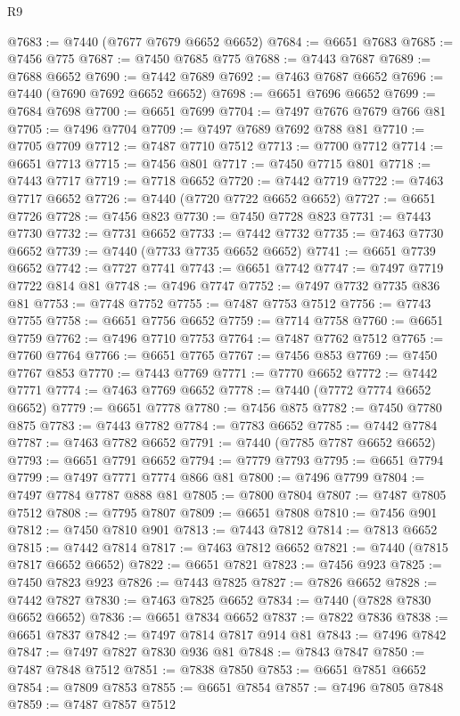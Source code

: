 \begin{lexlean}{R9}
\begin{coremodule}
{{{{{{{{{{{{{{{{{{{{{{{{{{{{{{{{{{{{{{{{{{{{{{{{{{{{{{{{{{{{{{{{{{{{{{{{{{{{{{{{{{{{@7683 := @7440 (@7677 @7679 @6652 @6652)
@7684 := @6651 @7683
@7685 := @7456 @775
@7687 := @7450 @7685 @775
@7688 := @7443 @7687
@7689 := @7688 @6652
@7690 := @7442 @7689
@7692 := @7463 @7687 @6652
@7696 := @7440 (@7690 @7692 @6652 @6652)
@7698 := @6651 @7696 @6652
@7699 := @7684 @7698
@7700 := @6651 @7699
@7704 := @7497 @7676 @7679 @766 @81
@7705 := @7496 @7704
@7709 := @7497 @7689 @7692 @788 @81
@7710 := @7705 @7709
@7712 := @7487 @7710 @7512
@7713 := @7700 @7712
@7714 := @6651 @7713
@7715 := @7456 @801
@7717 := @7450 @7715 @801
@7718 := @7443 @7717
@7719 := @7718 @6652
@7720 := @7442 @7719
@7722 := @7463 @7717 @6652
@7726 := @7440 (@7720 @7722 @6652 @6652)
@7727 := @6651 @7726
@7728 := @7456 @823
@7730 := @7450 @7728 @823
@7731 := @7443 @7730
@7732 := @7731 @6652
@7733 := @7442 @7732
@7735 := @7463 @7730 @6652
@7739 := @7440 (@7733 @7735 @6652 @6652)
@7741 := @6651 @7739 @6652
@7742 := @7727 @7741
@7743 := @6651 @7742
@7747 := @7497 @7719 @7722 @814 @81
@7748 := @7496 @7747
@7752 := @7497 @7732 @7735 @836 @81
@7753 := @7748 @7752
@7755 := @7487 @7753 @7512
@7756 := @7743 @7755
@7758 := @6651 @7756 @6652
@7759 := @7714 @7758
@7760 := @6651 @7759
@7762 := @7496 @7710 @7753
@7764 := @7487 @7762 @7512
@7765 := @7760 @7764
@7766 := @6651 @7765
@7767 := @7456 @853
@7769 := @7450 @7767 @853
@7770 := @7443 @7769
@7771 := @7770 @6652
@7772 := @7442 @7771
@7774 := @7463 @7769 @6652
@7778 := @7440 (@7772 @7774 @6652 @6652)
@7779 := @6651 @7778
@7780 := @7456 @875
@7782 := @7450 @7780 @875
@7783 := @7443 @7782
@7784 := @7783 @6652
@7785 := @7442 @7784
@7787 := @7463 @7782 @6652
@7791 := @7440 (@7785 @7787 @6652 @6652)
@7793 := @6651 @7791 @6652
@7794 := @7779 @7793
@7795 := @6651 @7794
@7799 := @7497 @7771 @7774 @866 @81
@7800 := @7496 @7799
@7804 := @7497 @7784 @7787 @888 @81
@7805 := @7800 @7804
@7807 := @7487 @7805 @7512
@7808 := @7795 @7807
@7809 := @6651 @7808
@7810 := @7456 @901
@7812 := @7450 @7810 @901
@7813 := @7443 @7812
@7814 := @7813 @6652
@7815 := @7442 @7814
@7817 := @7463 @7812 @6652
@7821 := @7440 (@7815 @7817 @6652 @6652)
@7822 := @6651 @7821
@7823 := @7456 @923
@7825 := @7450 @7823 @923
@7826 := @7443 @7825
@7827 := @7826 @6652
@7828 := @7442 @7827
@7830 := @7463 @7825 @6652
@7834 := @7440 (@7828 @7830 @6652 @6652)
@7836 := @6651 @7834 @6652
@7837 := @7822 @7836
@7838 := @6651 @7837
@7842 := @7497 @7814 @7817 @914 @81
@7843 := @7496 @7842
@7847 := @7497 @7827 @7830 @936 @81
@7848 := @7843 @7847
@7850 := @7487 @7848 @7512
@7851 := @7838 @7850
@7853 := @6651 @7851 @6652
@7854 := @7809 @7853
@7855 := @6651 @7854
@7857 := @7496 @7805 @7848
@7859 := @7487 @7857 @7512
}}}}}}}}}}}}}}}}}}}}}}}}}}}}}}}}}}}}}}}}}}}}}}}}}}}}}}}}}}}}}}}}}}}}}}}}}}}}}}}}}}}}
\end{coremodule}
\end{lexlean}
